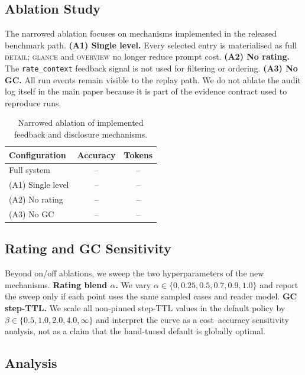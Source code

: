 

\subsection{Ablation Study}

The narrowed ablation focuses on mechanisms implemented in the
released benchmark path.
\textbf{(A1) Single level.} Every selected entry is materialised as
full \textsc{detail}; \textsc{glance} and \textsc{overview} no longer
reduce prompt cost.
\textbf{(A2) No rating.} The \texttt{rate\_context} feedback signal is
not used for filtering or ordering.
\textbf{(A3) No GC.} All run events remain visible to the replay path.
We do not ablate the audit log itself in the main paper because it is
part of the evidence contract used to reproduce runs.

\begin{table}[t]
    \centering
    \small
    \begin{tabular}{lcc}
        \toprule
        Configuration & Accuracy & Tokens \\
        \midrule
        Full system & -- & -- \\
        \midrule
        (A1) Single level & -- & -- \\
        (A2) No rating & -- & -- \\
        (A3) No GC & -- & -- \\
        \bottomrule
    \end{tabular}
    \caption{Narrowed ablation of implemented feedback and disclosure
    mechanisms.}
    \label{tab:ablation}
\end{table}

\subsection{Rating and GC Sensitivity}

Beyond on/off ablations, we sweep the two hyperparameters of the new
mechanisms. \textbf{Rating blend $\alpha$.} We vary
$\alpha \in \{0, 0.25, 0.5, 0.7, 0.9, 1.0\}$ and report the sweep only
if each point uses the same sampled cases and reader model.
\textbf{GC step-TTL.} We scale all non-pinned step-TTL values in the
default policy by $\beta \in \{0.5, 1.0, 2.0, 4.0, \infty\}$ and
interpret the curve as a cost--accuracy sensitivity analysis, not as a
claim that the hand-tuned default is globally optimal.

\subsection{Analysis}


